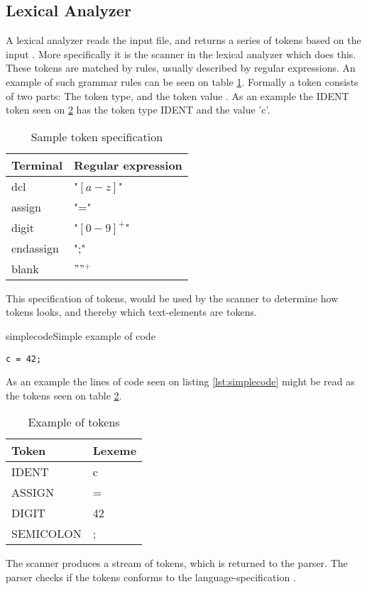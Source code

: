 \subsection{Lexical Analyzer}
A lexical analyzer reads the input file, and returns a series of tokens based on the input \citep{CraftingACompiler}. More specifically it is the scanner in the lexical analyzer which does this. These tokens are matched by rules, usually described by regular expressions. An example of such grammar rules can be seen on table \ref{tab:tokenspecification}. Formally a token consists of two parts: The token type, and the token value \citep{CraftingACompiler}. As an example the IDENT token seen on \ref{tab:tokensexample} has the token type IDENT and the value 'c'. 

\begin{table}[H]
\begin{tabular}{|l|l|}
\hline
    	Terminal  	& Regular expression 	\\ \hline
    	dcl       	& "$[a-z]$"      			\\ 
    	assign    	& "="      				\\ 
    	digit     	& "$[0-9]^+$"   			\\ 
    	endassign 	& ";"      				\\
    	blank 		& $" "^+$					\\
    \hline
\end{tabular}
\caption{Sample token specification}
\label{tab:tokenspecification}
\end{table}
This specification of tokens, would be used by the scanner to determine how tokens looks, and thereby which text-elements are tokens. 

\begin{code}{simplecode}{Simple example of code}
\begin{lstlisting}
c = 42;
\end{lstlisting}
\end{code}

As an example the lines of code seen on listing \ref{lst:simplecode} might be read as the tokens seen on table \ref{tab:tokensexample}.
\begin{table}[H]
\begin{tabular}{|l|l|}
\hline
    \textbf{Token}     &\textbf{Lexeme} \\ \hline
    IDENT     & c      \\ 
    ASSIGN    & =      \\ 
    DIGIT     & 42     \\ 
    SEMICOLON & ;      \\
    \hline
\end{tabular}
\caption{Example of tokens}
\label{tab:tokensexample}
\end{table}
The scanner produces a stream of tokens, which is returned to the parser. The parser checks if the tokens conforms to the language-specification \citep{CraftingACompiler}.